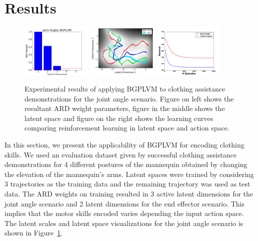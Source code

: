 \documentclass{article}
\begin{document}
\section{Results}
\label{section:results}

\begin{figure}
  \centering
  \includegraphics[width=0.3\textwidth]{latentscales.png}
  \includegraphics[width=0.3\textwidth]{latentspace.png}
  \includegraphics[width=0.3\textwidth]{rlcurve.png}
  \caption{Experimental results of applying BGPLVM to clothing assistance demonstrations for the joint angle scenario. Figure on left shows the resultant ARD weight parameters, figure in the middle shows the latent space and figure on the right shows the learning curves comparing reinforcement learning in latent space and action space.}
  \label{figure:results}
\end{figure}

In this section, we present the applicability of BGPLVM for encoding clothing skills. We used an evaluation dataset given by successful clothing assistance demonstrations for 4 different postures of the mannequin obtained by changing the elevation of the mannequin's arms. Latent spaces were trained by considering 3 trajectories as the training data and the remaining trajectory was used as test data. The ARD weights on training resulted in 3 active latent dimensions for the joint angle scenario and 2 latent dimensions for the end effector scenario. This implies that the motor skills encoded varies depending the input action space. The latent scales and latent space visualizations for the joint angle scenario is shown in Figure~\ref{figure:results}.
\end{document}
